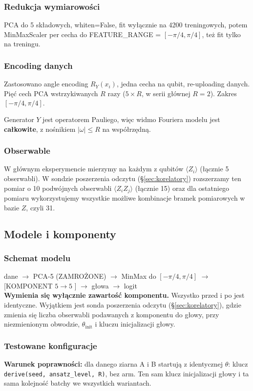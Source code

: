 \documentclass[11pt, a4paper]{article}
\begin{document}
\subsubsection{Redukcja wymiarowości}
PCA do 5 składowych, whiten=False, fit wyłącznie na 4200 treningowych, potem MinMaxScaler per cecha do FEATURE\_RANGE = $[-\pi/4, \pi/4]$, też fit tylko na treningu.

\subsubsection{Encoding danych}
Zastosowano angle encoding $R_Y(x_i)$, jedna cecha na qubit, re-uploading danych. Pięć cech PCA wstrzykiwanych $R$ razy ($5\times R$, w serii głównej $R=2$). Zakres $[-\pi/4, \pi/4]$.

Generator $Y$ jest operatorem Pauliego, więc widmo Fouriera modelu jest \textbf{całkowite}, z nośnikiem $|\omega| \leq R$ na współrzędną.

\subsubsection{Obserwable}
W głównym eksperymencie mierzymy na każdym z qubitów $\langle Z_i \rangle$ (łącznie 5 obserwabli). W sondzie poszerzenia odczytu (\S\ref{sec:korelatory}) rozszerzamy ten pomiar o 10 podwójnych obserwabli $\langle Z_i Z_j \rangle$ (łącznie 15) oraz dla ostatniego pomiaru wykorzystujemy wszystkie możliwe kombinacje bramek pomiarowych w bazie $Z$, czyli 31.

\subsection{Modele i komponenty}

\subsubsection{Schemat modelu}
dane $\rightarrow$ PCA-5 (ZAMROŻONE) $\rightarrow$ MinMax do $[-\pi/4, \pi/4]$ $\rightarrow$ [KOMPONENT $5\rightarrow5$ ] $\rightarrow$ głowa $\rightarrow$ logit \\
\textbf{Wymienia się wyłącznie zawartość komponentu.} Wszystko przed i po jest identyczne. Wyjątkiem jest sonda poszerzenia odczytu (\S\ref{sec:korelatory}), gdzie zmienia się liczba obserwabli podawanych z komponentu do głowy, przy niezmienionym obwodzie, $\theta_{\text{init}}$ i kluczu inicjalizacji głowy.

\subsubsection{Testowane konfiguracje}\label{sec:testowane-konfiguracje}
\textbf{Warunek poprawności:} dla danego ziarna A i B startują z identycznej $\theta$: klucz \texttt{derive(seed, ansatz\_level, R)}, bez arm. Ten sam klucz inicjalizacji głowy i ta sama kolejność batchy we wszystkich wariantach.
\end{document}
